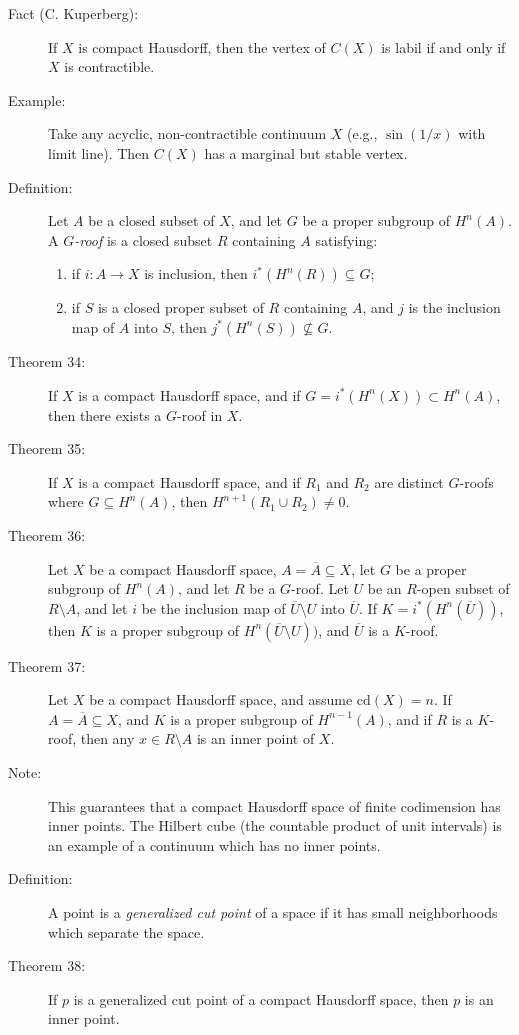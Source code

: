 \documentclass{article}
\begin{document}
\begin{description}
\item[Fact (C. Kuperberg):] If $X$ is compact Hausdorff, then the vertex of $C(X)$ is labil if and only if $X$ is contractible.

\item[Example:] Take any acyclic, non-contractible continuum $X$ (e.g., $\sin(1/x)$ with limit line). Then $C(X)$ has a marginal but stable vertex.

\item[Definition:] Let $A$ be a closed subset of $X$, and let $G$ be a proper subgroup of $H^n(A)$. A \emph{$G$-roof} is a closed subset $R$ containing $A$ satisfying:
  \begin{enumerate}[\hspace{1cm}(1)]
    \item if $i: A \rightarrow X$ is inclusion, then $i^*(H^n(R)) \subseteq G$;
    \item if $S$ is a closed proper subset of $R$ containing $A$, and $j$ is the inclusion map of $A$ into $S$, then $j^*(H^n(S)) \not\subseteq G$.
  \end{enumerate}

\item[Theorem 34:] If $X$ is a compact Hausdorff space, and if $G=i^*(H^n(X)) \subset H^n(A)$, then there exists a $G$-roof in $X$.

\item[Theorem 35:] If $X$ is a compact Hausdorff space, and if $R_1$ and $R_2$ are distinct $G$-roofs where $G \subseteq H^n(A)$, then $H^{n+1} (R_1 \cup R_2) \neq 0$.

\item[Theorem 36:] Let $X$ be a compact Hausdorff space, $A = \overline{A} \subseteq X$, let $G$ be a proper subgroup of $H^n(A)$, and let $R$ be a $G$-roof. Let $U$ be an $R$-open subset of $R \setminus A$, and let $i$ be the inclusion map of $\overline{U} \setminus U$ into $\overline{U}$. If $K=i^*(H^n(\overline{U}))$, then $K$ is a proper subgroup of $H^n(\overline{U} \setminus U))$, and $\overline{U}$ is a $K$-roof.

\item[Theorem 37:] Let $X$ be a compact Hausdorff space, and assume $\text{cd}(X)=n$.  If $A = \overline{A} \subseteq X$, and $K$ is a proper subgroup of $H^{n-1}(A)$, and if $R$ is a $K$-roof, then any $x \in R \setminus A$ is an inner point of $X$.

\item[Note:] This guarantees that a compact Hausdorff space of finite codimension has inner points. The Hilbert cube (the countable product of unit intervals) is an example of a continuum which has no inner points.

\item[Definition:] A point is a \emph{generalized cut point} of a space if it has small neighborhoods which separate the space.

\item[Theorem 38:] If $p$ is a generalized cut point of a compact Hausdorff space, then $p$ is an inner point.

\end{description}
\end{document}

